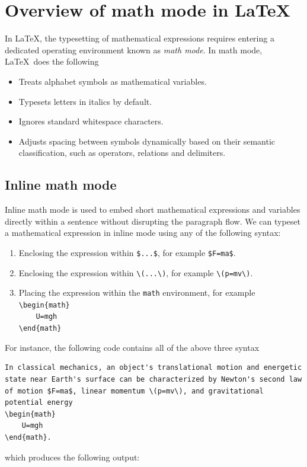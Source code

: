 \section{Overview of math mode in \LaTeX}
	In \LaTeX, the typesetting of mathematical expressions requires entering a dedicated operating environment known as \emph{math mode}. In math mode, \LaTeX\ does the following
	\begin{itemize}
		\item Treats alphabet symbols as mathematical variables.
		\item Typesets letters in italics by default.
		\item Ignores standard whitespace characters.
		\item Adjusts spacing between symbols dynamically based on their semantic classification, such as operators, relations and delimiters.
	\end{itemize}
	
	\subsection{Inline math mode}
		Inline math mode is used to embed short mathematical expressions and variables directly within a sentence without disrupting the paragraph flow. We can typeset a mathematical expression in inline mode using any of the following syntax:
		\begin{enumerate}
			\item Enclosing the expression within \lstinline|$...$|, for example \lstinline|$F=ma$|.
			\item Enclosing the expression within \lstinline|\(...\)|, for example \lstinline|\(p=mv\)|.
			\item Placing the expression within the \lstinline|math| environment, for example\\
			\lstinline|\begin{math}|\\
			\lstinline|    U=mgh|\\
			\lstinline|\end{math}|
		\end{enumerate}
		
		For instance, the following code contains all of the above three syntax
\begin{lstlisting}
In classical mechanics, an object's translational motion and energetic state near Earth's surface can be characterized by Newton's second law of motion $F=ma$, linear momentum \(p=mv\), and gravitational potential energy
\begin{math}
	U=mgh
\end{math}.
\end{lstlisting}
		which produces the following output:
		
